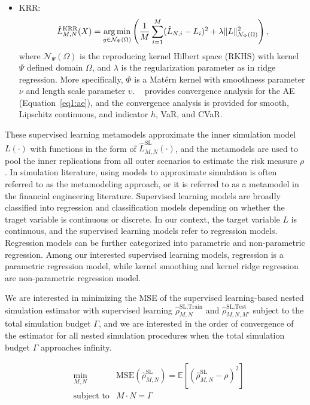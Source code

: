 \begin{itemize}
    \item   KRR:
            $$\hat{L}^{\text{KRR}}_{M, N}(X) = \operatorname*{arg\,min}_{g \in \mathcal{N}_{\Psi}(\Omega)} \left( \frac{1}{M} \sum_{i=1}^M (\hat{L}_{N, i} - L_i)^2 + \lambda \|L\|_{\mathcal{N}_{\Psi}(\Omega)}^2\right),$$
            where $\mathcal{N}_{\Psi}(\Omega)$ is the reproducing kernel Hilbert space (RKHS) with kernel $\Psi$ defined domain $\Omega$, and $\lambda$ is the regularization parameter as in ridge regression. 
            More specifically, $\Phi$ is a Mat\'ern kernel with smoothness parameter $\nu$ and length scale parameter $\upsilon$.
            ~\cite{wang2022smooth} provides convergence analysis for the AE (Equation~\ref{eq1:ae}), and the convergence analysis is provided for smooth, Lipschitz continuous, and indicator $h$, VaR, and CVaR.
\end{itemize}

These supervised learning metamodels approximate the inner simulation model $L(\cdot)$ with functions in the form of $\hat{L}^{\text{SL}}_{M, N}(\cdot)$, and the metamodels are used to pool the inner replications from all outer scenarios to estimate the risk measure $\rho$.
In simulation literature, using models to approximate simulation is often referred to as the metamodeling approach, or it is referred to as a metamodel in the financial engineering literature.
Supervised learning models are broadly classified into regression and classification models depending on whether the traget variable is continuous or discrete.
In our context, the target variable $L$ is continuous, and the supervised learning models refer to regression models.
Regression models can be further categorized into parametric and non-parametric regression.
Among our interested supervised learning models, regression is a parametric regression model, while kernel smoothing and kernel ridge regression are non-parametric regression model.

We are interested in minimizing the MSE of the supervised learning-based nested simulation estimator with supervised learning $\hat{\rho}^{\text{SL}, \text{Train}}_{M, N}$ and $\hat{\rho}^{\text{SL}, \text{Test}}_{M, N, M'}$ subject to the total simulation budget $\Gamma$, and we are interested in the order of convergence of the estimator for all nested simulation procedures when the total simulation budget $\Gamma$ approaches infinity.

\begin{align}
    & \min_{M, N}  & \text{MSE}(\hat{\rho}^{\text{SL}}_{M, N}) = \mathbb{E} \left[ \left( \hat{\rho}^{\text{SL}}_{M, N} - \rho \right)^2 \right] \nonumber \\
    & \text{subject to} & M \cdot N = \Gamma 
\end{align}


